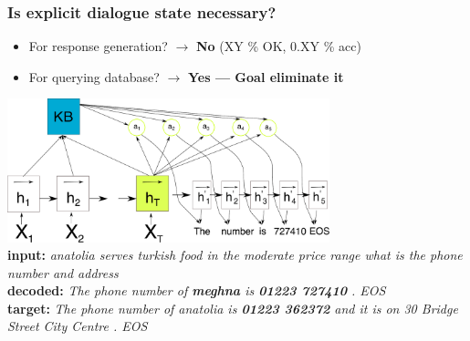 \documentclass[10pt, compress,british,xcolor={svgnames,dvipsnames,x11names},trans]{beamer}
\begin{document}
\begin{frame}\frametitle{Is explicit dialogue state necessary?}
    \begin{itemize}
        \item For response generation? $\longrightarrow$ {\bf No} {\footnotesize (XY \% OK, 0.XY \% acc)}
        \item For querying database? $\longrightarrow$ {\bf Yes\cite{wen_networkbased_2016} --- Goal eliminate it}
    \end{itemize}
    \includegraphics[width=0.7\textwidth]{./encdecdb.pdf} \\
    {\bf input:} {\it anatolia serves turkish food in the moderate price range what is the phone number and address} \\
    {\bf decoded:} {\it The phone number of {\bf meghna} is {\bf 01223 727410} . EOS} \\
    {\bf target:} {\it The phone number of anatolia is {\bf 01223 362372} and it is on 30 Bridge Street City Centre . EOS } \\
\end{frame}
\end{document}
